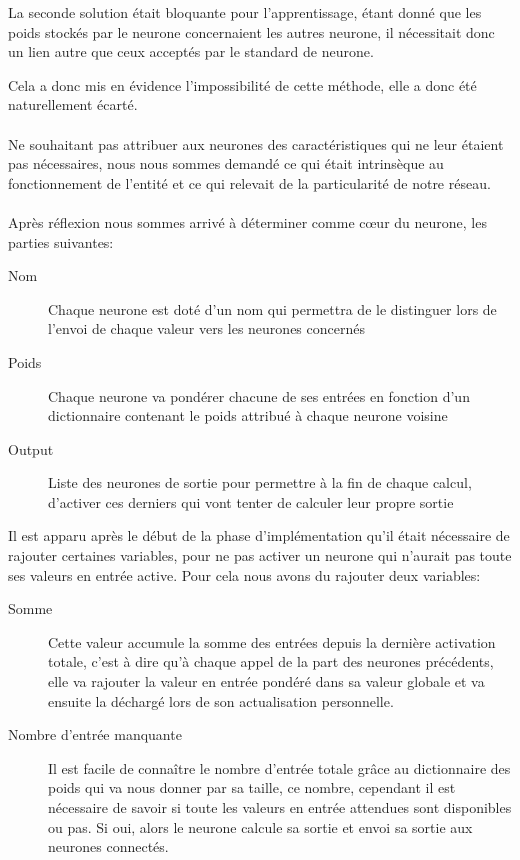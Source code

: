 La seconde solution était bloquante pour l'apprentissage, étant donné que les
poids stockés par le neurone concernaient les autres neurone, il nécessitait
donc un lien autre que ceux acceptés par le standard de neurone.

Cela a donc mis en évidence l'impossibilité de cette méthode, elle a donc été
naturellement écarté.

\paragraph{}


\paragraph{}
Ne souhaitant pas attribuer aux neurones des caractéristiques qui ne leur étaient
pas nécessaires, nous nous sommes demandé ce qui était intrinsèque au
fonctionnement de l'entité et ce qui relevait de la particularité de notre
réseau.

\paragraph{}
Après réflexion nous sommes arrivé à déterminer comme cœur du neurone, les
parties suivantes:\\

\begin{description}
  \item[Nom] Chaque neurone est doté d'un nom qui permettra de le distinguer
    lors de l'envoi de chaque valeur vers les neurones concernés
  \item[Poids] Chaque neurone va pondérer chacune de ses entrées en fonction
    d'un dictionnaire contenant le poids attribué à chaque neurone voisine
  \item[Output] Liste des neurones de sortie pour permettre à la fin de chaque
    calcul, d'activer ces derniers qui vont tenter de calculer leur propre
    sortie
\end{description}

Il est apparu après le début de la phase d'implémentation qu'il était nécessaire
de rajouter certaines variables, pour ne pas activer un neurone qui n'aurait pas
toute ses valeurs en entrée active.
Pour cela nous avons du rajouter deux variables:\\

\begin{description}
  \item[Somme] Cette valeur accumule la somme des entrées depuis la dernière
    activation totale, c'est à dire qu'à chaque appel de la part des neurones
    précédents, elle va rajouter la valeur en entrée pondéré dans sa valeur
    globale et va ensuite la déchargé lors de son actualisation personnelle. 
  \item[Nombre d'entrée manquante] Il est facile de connaître le nombre d'entrée
    totale grâce au dictionnaire des poids qui va nous donner par sa taille, ce
    nombre, cependant il est nécessaire de savoir si toute les valeurs en entrée
    attendues sont disponibles ou pas. Si oui, alors le neurone calcule sa
    sortie et envoi sa sortie aux neurones connectés.
  \end{description}

